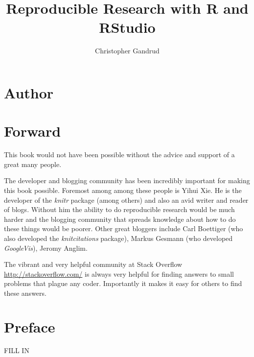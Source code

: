 \documentclass[ChapterTOCs,krantz1]{krantz}\usepackage{graphicx, color}
\begin{document}
\title{Reproducible Research with R and RStudio}

\author{Christopher Gandrud}

\maketitle

\frontmatter

{\chapter*{Author}}





\chapter*{Forward}

This book would not have been possible without the advice and support of a great many people.

The developer and blogging community has been incredibly important for making this book possible. Foremost among among these people is Yihui Xie. He is the developer of the {\emph{knitr}} package (among others) and also an avid writer and reader of blogs. Without him the ability to do reproducible research would be much harder and the blogging community that spreads knowledge about how to do these things would be poorer. Other great bloggers include Carl Boettiger (who also developed the {\emph{knitcitations}} package), Markus Gesmann (who developed {\emph{GoogleVis}}), Jeromy Anglim.

The vibrant and very helpful community at Stack Overflow \url{http://stackoverflow.com/} is always very helpful for finding answers to small problems that plague any coder. Importantly it makes it easy for others to find these answers.



\chapter*{Preface}

FILL IN
\end{document}
